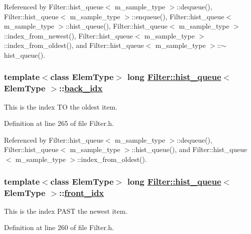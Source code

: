 Referenced by Filter::hist\_\-queue$<$ m\_\-sample\_\-type $>$::dequeue(), Filter::hist\_\-queue$<$ m\_\-sample\_\-type $>$::enqueue(), Filter::hist\_\-queue$<$ m\_\-sample\_\-type $>$::hist\_\-queue(), Filter::hist\_\-queue$<$ m\_\-sample\_\-type $>$::index\_\-from\_\-newest(), Filter::hist\_\-queue$<$ m\_\-sample\_\-type $>$::index\_\-from\_\-oldest(), and Filter::hist\_\-queue$<$ m\_\-sample\_\-type $>$::$\sim$hist\_\-queue().\hypertarget{classFilter_1_1hist__queue_r2}{
\subsubsection[back\_\-idx]{\setlength{\rightskip}{0pt plus 5cm}template$<$class Elem\-Type$>$ long \hyperlink{classFilter_1_1hist__queue}{Filter::hist\_\-queue}$<$ Elem\-Type $>$::\hyperlink{classFilter_1_1hist__queue_r2}{back\_\-idx}}}
\label{classFilter_1_1hist__queue_r2}


This is the index TO the oldest item. 

Definition at line 265 of file Filter.h.

Referenced by Filter::hist\_\-queue$<$ m\_\-sample\_\-type $>$::dequeue(), Filter::hist\_\-queue$<$ m\_\-sample\_\-type $>$::hist\_\-queue(), and Filter::hist\_\-queue$<$ m\_\-sample\_\-type $>$::index\_\-from\_\-oldest().\hypertarget{classFilter_1_1hist__queue_r1}{
\subsubsection[front\_\-idx]{\setlength{\rightskip}{0pt plus 5cm}template$<$class Elem\-Type$>$ long \hyperlink{classFilter_1_1hist__queue}{Filter::hist\_\-queue}$<$ Elem\-Type $>$::\hyperlink{classFilter_1_1hist__queue_r1}{front\_\-idx}}}
\label{classFilter_1_1hist__queue_r1}


This is the index PAST the newest item. 

Definition at line 260 of file Filter.h.


